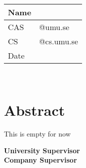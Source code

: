 \begin{titlepage}
	\thispagestyle{empty}
	\noindent {\large \MakeUppercase\university \\
				\instution \\
				\pagetypename \\
			  }

	\begin{center}
	\Large{\textbf{\titleFrontPage}}\\[7pt]

	\Large{\assignmentname}\\[40.0pt]
    
	\begin{tabular}{p{2cm}p{9.5cm}}
		\hline
		Name &  \hfill \name\\\hline
		CAS & \hfill \casuser @umu.se \\\hline
		CS & \hfill \csuser  @cs.umu.se \\\hline
		Date & \hfill \datemade\\ \hline
	\end{tabular}\\
	
	\vspace{10mm}
	\section*{Abstract}\vspace{-10mm}
	This is empty for now
    \vfill
    
	\large{\textbf{University Supervisor\\}\usupervisor}
	\large{\textbf{Company Supervisor\\}\csupervisor}
	\end{center}
	\thispagestyle{empty}
\end{titlepage}
